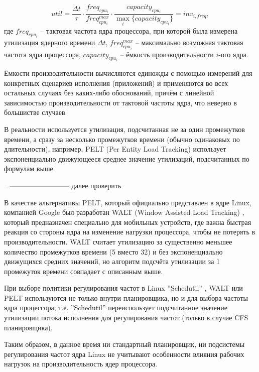     \begin{equation}
        util = \frac{\Delta t}{\tau} \cdot \frac{freq_{cpu_{i}}}{freq^{max}_{cpu_{i}}} \cdot
               \frac{capacity_{cpu_{i}}}{\max_i \{capacity_{cpu_{i}}\}} =
            inv_{i, freq},
    \end{equation}
    где $freq_{cpu_{i}}$ -- тактовая частота ядра процессора, при которой была измерена утилизация
    ядерного времени $\Delta t$, $freq^{max}_{cpu_{i}}$ -- максимально возможная тактовая частота ядра
    процессора, $capacity_{cpu_{i}}$ -- ёмкость производительности $i$-ого ядра.

    Ёмкости производительности вычисляются единожды с помощью измерений для конкретных сценариев
    исполнения (приложений) и применяются во всех остальных случаях без каких-либо обоснований,
    причём с линейной зависимостью производительности от тактовой частоты ядра, что неверно
    в большистве случаев.

    В реальности используется утилизация, подсчитанная не за один промежутков времени, а сразу за
    несколько промежутков времени (обычно одинаковых по длительности), например, PELT
    (Per Entity Load Tracking) \cite{KernelDocsSchedutil} использует экспоненциально движующееся
    среднее значение утилизаций, подсчитанных по формулам выше.

    =-------------------------- далее проверить

    В качестве альтернативы PELT, который официально представлен в ядре Linux, компанией Google
    был разработан WALT (Window Assisted Load Tracking) \cite{QualcommWALT}, который предназначен
    специально для мобильных устройств, где важна быстрая реакция со стороны ядра на изменение
    нагрузки процессора, чтобы не потерять в производительности.
    WALT считает утилизацию за существенно меньшее количество промежутков времени (5 вместо 32) и без
    экспоненциально движущихся средних значений, но алгоритм подсчёта утилизации за 1 промежуток времени
    совпадает с описанным выше.

    При выборе политики регулирования частот в Linux ''Schedutil'' \cite{KernelDocsSchedutil},
    WALT или PELT используются не только внутри планировщика, но и для выбора частоты ядра процессора, т.е.
    ''Schedutil'' переиспользует подсчитанное значение утилизации потока исполнения для регулирования
    частот (только в случае CFS планировщика).

    Таким образом, в данное время ни стандартный планировщик, ни подсистемы регулирования частот
    ядра Linux не учитывают особенности влияния рабочих нагрузок на производительность
    ядер процессора.

